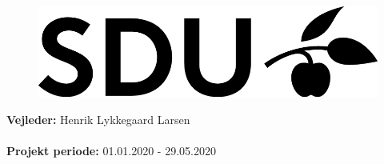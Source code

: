 \begin{titlepage}
\begin{center}
\begin{tabular}{c c c}
        	\\
\end{tabular}

\vfill
\begin{figure}[H]
\centering
\includegraphics[scale=0.8]{figures/SDU_BLACK_RGB.png}
\end{figure}
\vfill


\textbf{Vejleder:} Henrik Lykkegaard Larsen \\ \mbox{}\\
\textbf{Projekt periode:} 01.01.2020 - 29.05.2020
\end{center}
\end{titlepage}

